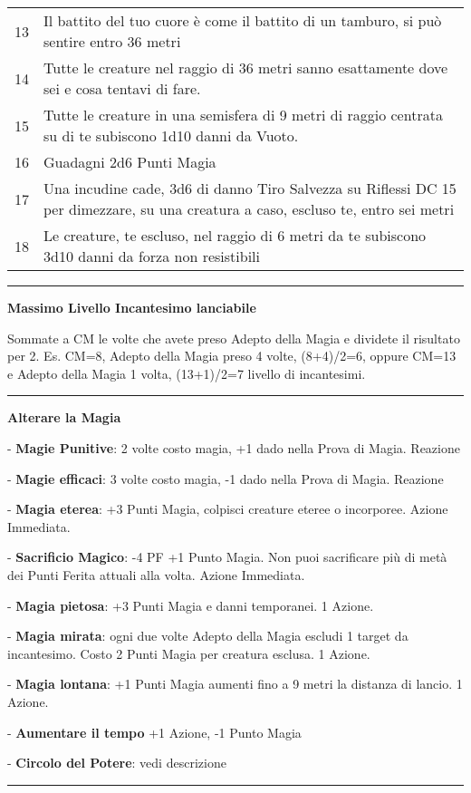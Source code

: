 \documentclass[a4paper,12 pt,openany]{book}
\newcommand{\riga}{\rule{\textwidth}{0.4pt}}
\begin{document}
\begin{textblock*}{13.5cm}
\begin{tabularx}{0.95\textwidth}{lX}
13 & Il battito del tuo cuore è come il battito di un tamburo, si può sentire entro 36 metri\\
14 & Tutte le creature nel raggio di 36 metri sanno esattamente dove sei e cosa tentavi di fare.\\
15 & Tutte le creature in una semisfera di 9 metri di raggio centrata su di te subiscono 1d10 danni da Vuoto.\\
16 & Guadagni 2d6 Punti Magia\\
17 & Una incudine cade, 3d6 di danno Tiro Salvezza su Riflessi DC 15 per dimezzare, su una creatura a caso, escluso te, entro sei metri\\
18 & Le creature, te escluso, nel raggio di 6 metri da te subiscono 3d10 danni da forza non resistibili
\end{tabularx}

\riga

\textbf{Massimo Livello Incantesimo lanciabile}

Sommate a CM le volte che avete preso Adepto della Magia e dividete il risultato per 2. Es. CM=8, Adepto della Magia preso 4 volte, (8+4)/2=6, oppure CM=13 e Adepto della Magia 1 volta, (13+1)/2=7 livello di incantesimi.

\riga

\textbf{Alterare la Magia}

- \textbf{Magie Punitive}: 2 volte costo magia, +1 dado nella Prova di Magia. Reazione

- \textbf{Magie efficaci}: 3 volte costo magia, -1 dado nella Prova di Magia. Reazione

- \textbf{Magia eterea}: +3 Punti Magia, colpisci creature eteree o incorporee. Azione Immediata.

- \textbf{Sacrificio Magico}: -4 PF +1 Punto Magia. Non puoi sacrificare più di metà dei Punti Ferita attuali alla volta. Azione Immediata.

- \textbf{Magia pietosa}: +3 Punti Magia e danni temporanei. 1 Azione.

- \textbf{Magia mirata}: ogni due volte Adepto della Magia escludi 1 target da incantesimo. Costo 2 Punti Magia per creatura esclusa. 1 Azione.

- \textbf{Magia lontana}: +1 Punti Magia aumenti fino a 9 metri la distanza di lancio. 1 Azione.

- \textbf{Aumentare il tempo} +1 Azione,  -1 Punto Magia

- \textbf{Circolo del Potere}: vedi descrizione

\riga

\end{textblock*}




~\newpage
\end{document}
